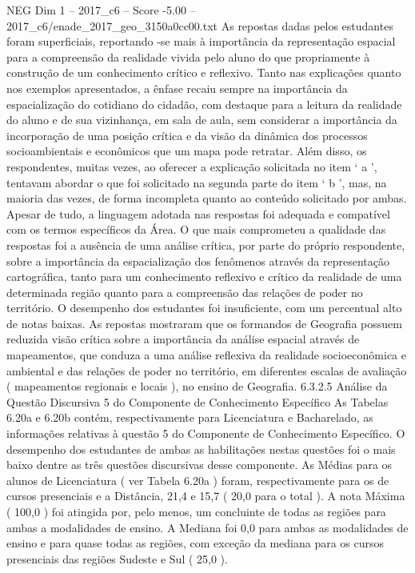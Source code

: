 \begin{textsample}{NEG Dim 1 – 2017\_c6 – Score -5.00 – 2017\_c6/enade\_2017\_geo\_3150a0cc00.txt}
As repostas dadas pelos estudantes foram superficiais, reportando -se mais à importância da representação espacial para a compreensão da realidade vivida pelo aluno do que propriamente à construção de um conhecimento crítico e reflexivo.
Tanto nas explicações quanto nos exemplos apresentados, a ênfase recaiu sempre na importância da espacialização do cotidiano do cidadão, com destaque para a leitura da realidade do aluno e de sua vizinhança, em sala de aula, sem considerar a importância da incorporação de uma posição crítica e da visão da dinâmica dos processos socioambientais e econômicos que um mapa pode retratar.
Além disso, os respondentes, muitas vezes, ao oferecer a explicação solicitada no item ‘ a ’, tentavam abordar o que foi solicitado na segunda parte do item ‘ b ’, mas, na maioria das vezes, de forma incompleta quanto ao conteúdo solicitado por ambas.
Apesar de tudo, a linguagem adotada nas respostas foi adequada e compatível com os termos específicos da Área.
O que mais comprometeu a qualidade das respostas foi a ausência de uma análise crítica, por parte do próprio respondente, sobre a importância da espacialização dos fenômenos através da representação cartográfica, tanto para um conhecimento reflexivo e crítico da realidade de uma determinada região quanto para a compreensão das relações de poder no território.
O desempenho dos estudantes foi insuficiente, com um percentual alto de notas baixas.
As repostas mostraram que os formandos de Geografia possuem reduzida visão crítica sobre a importância da análise espacial através de mapeamentos, que conduza a uma análise reflexiva da realidade socioeconômica e ambiental e das relações de poder no território, em diferentes escalas de avaliação ( mapeamentos regionais e locais ), no ensino de Geografia. 6.3.2.5 Análise da Questão Discursiva 5 do Componente de Conhecimento Específico As Tabelas 6.20a e 6.20b contém, respectivamente para Licenciatura e Bacharelado, as informações relativas à questão 5 do Componente de Conhecimento Específico.
O desempenho dos estudantes de ambas as habilitações nestas questões foi o mais baixo dentre as três questões discursivas desse componente.
As Médias para os alunos de Licenciatura ( ver Tabela 6.20a ) foram, respectivamente para os de cursos presenciais e a Distância, 21,4 e 15,7 ( 20,0 para o total ).
A nota Máxima ( 100,0 ) foi atingida por, pelo menos, um concluinte de todas as regiões para ambas a modalidades de ensino.
A Mediana foi 0,0 para ambas as modalidades de ensino e para quase todas as regiões, com exceção da mediana para os cursos presenciais das regiões Sudeste e Sul ( 25,0 ).

\end{textsample}
